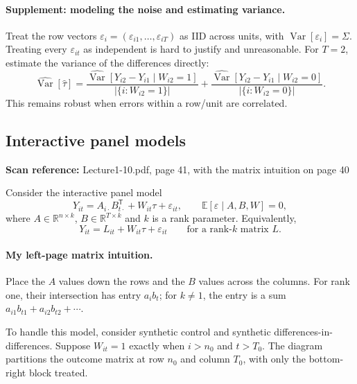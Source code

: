 \documentclass[11pt,a4paper]{article}
\newcommand{\sourcepages}[1]{\par{\small\sffamily\color{muted}\textbf{Scan reference:} #1\par}\nobreak\smallskip\nopagebreak[4]}
\begin{document}
\paragraph{Supplement: modeling the noise and estimating variance.}
Treat the row vectors $\varepsilon_i=(\varepsilon_{i1},\ldots,\varepsilon_{iT})$ as IID across units, with $\operatorname{Var}[\varepsilon_i]=\Sigma$. Treating every $\varepsilon_{it}$ as independent is hard to justify and unreasonable. For $T=2$, estimate the variance of the differences directly:
\[
\widehat{\operatorname{Var}}[\widehat\tau]
=\frac{\widehat{\operatorname{Var}}[Y_{i2}-Y_{i1}\mid W_{i2}=1]}{|\{i:W_{i2}=1\}|}
+\frac{\widehat{\operatorname{Var}}[Y_{i2}-Y_{i1}\mid W_{i2}=0]}{|\{i:W_{i2}=0\}|}.
\tag{8.4 in the notes}
\]
This remains robust when errors within a row/unit are correlated.

\clearpage
{}
\subsection{Interactive panel models}
\sourcepages{Lecture1-10.pdf, page 41, with the matrix intuition on page 40}
Consider the interactive panel model
\[
 Y_{it}=A_{i\cdot}B_{t\cdot}^{\mathsf T}+W_{it}\tau+\varepsilon_{it},
 \qquad\mathbb E[\varepsilon\mid A,B,W]=0,\tag{8.5}
\]
where $A\in\mathbb R^{n\times k}$, $B\in\mathbb R^{T\times k}$ and $k$ is a rank parameter. Equivalently,
\[
 Y_{it}=L_{it}+W_{it}\tau+\varepsilon_{it}
 \qquad\text{for a rank-$k$ matrix }L.
\]
\paragraph{My left-page matrix intuition.}
Place the $A$ values down the rows and the $B$ values across the columns. For rank one, their intersection has entry $a_i b_t$; for $k\ne1$, the entry is a sum $a_{i1}b_{t1}+a_{i2}b_{t2}+\cdots$. \begin{center}\end{center}

To handle this model, consider synthetic control and synthetic differences-in-differences. Suppose $W_{it}=1$ exactly when $i>n_0$ and $t>T_0$. The diagram partitions the outcome matrix at row $n_0$ and column $T_0$, with only the bottom-right block treated.
\begin{center}\end{center}
\end{document}
